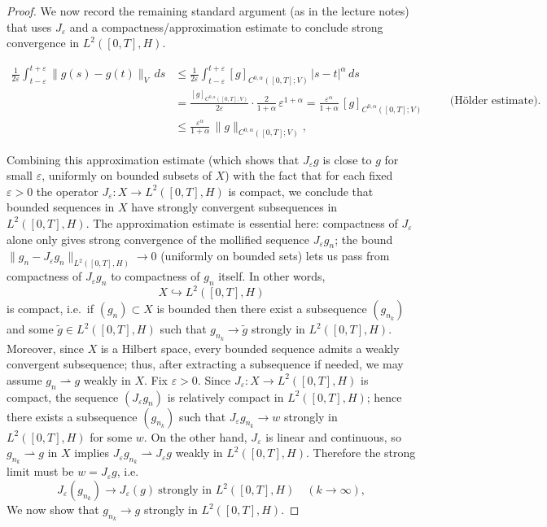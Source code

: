 \documentclass[11pt]{article}
\theoremstyle{definition}
\theoremstyle{remark}
\begin{document}
\begin{proof}
\medskip
\noindent
We now record the remaining standard argument (as in the lecture notes) that uses \(J_\varepsilon\) and a compactness/approximation estimate to conclude strong convergence in \(L^{2}([0,T],H)\).

\[
\begin{aligned}
\frac{1}{2\varepsilon}\int_{t-\varepsilon}^{t+\varepsilon}\|g(s)-g(t)\|_{V}\,ds
&\le \frac{1}{2\varepsilon}\int_{t-\varepsilon}^{t+\varepsilon}[g]_{C^{0,\alpha}([0,T];V)}\,|s-t|^{\alpha}\,ds\\
&= \frac{[g]_{C^{0,\alpha}([0,T];V)}}{2\varepsilon}\cdot \frac{2}{1+\alpha}\,\varepsilon^{1+\alpha}
= \frac{\varepsilon^{\alpha}}{1+\alpha}\,[g]_{C^{0,\alpha}([0,T];V)}\\
&\le \frac{\varepsilon^{\alpha}}{1+\alpha}\,\|g\|_{C^{0,\alpha}([0,T];V)},
\end{aligned}
\qquad \text{(H\"older estimate).}
\]

Combining this approximation estimate (which shows that \(J_\varepsilon g\) is close to \(g\) for small \(\varepsilon\), uniformly on bounded subsets of \(X\)) with the fact that for each fixed \(\varepsilon>0\) the operator \(J_\varepsilon:X\to L^{2}([0,T],H)\) is compact, we conclude that bounded sequences in \(X\) have strongly convergent subsequences in \(L^{2}([0,T],H)\). The approximation estimate is essential here: compactness of \(J_\varepsilon\) alone only gives strong convergence of the mollified sequence \(J_\varepsilon g_n\); the bound \(\|g_n-J_\varepsilon g_n\|_{L^{2}([0,T],H)}\to 0\) (uniformly on bounded sets) lets us pass from compactness of \(J_\varepsilon g_n\) to compactness of \(g_n\) itself. In other words,
\[
X\hookrightarrow L^{2}([0,T],H)
\]
is compact, i.e.\ if \((g_n)\subset X\) is bounded then there exist a subsequence \((g_{n_k})\) and some \(\tilde g\in L^{2}([0,T],H)\) such that \(g_{n_k}\to \tilde g\) strongly in \(L^{2}([0,T],H)\).
Moreover, since \(X\) is a Hilbert space, every bounded sequence admits a weakly convergent subsequence; thus, after extracting a subsequence if needed, we may assume \(g_{n}\rightharpoonup g\) weakly in \(X\).
Fix \(\varepsilon>0\). Since \(J_\varepsilon:X\to L^{2}([0,T],H)\) is compact, the sequence \((J_\varepsilon g_n)\) is relatively compact in \(L^{2}([0,T],H)\); hence there exists a subsequence \((g_{n_k})\) such that \(J_\varepsilon g_{n_k}\to w\) strongly in \(L^{2}([0,T],H)\) for some \(w\).
On the other hand, \(J_\varepsilon\) is linear and continuous, so \(g_{n_k}\rightharpoonup g\) in \(X\) implies \(J_\varepsilon g_{n_k}\rightharpoonup J_\varepsilon g\) weakly in \(L^{2}([0,T],H)\). Therefore the strong limit must be \(w=J_\varepsilon g\), i.e.
\[
J_{\varepsilon}(g_{n_k})\to J_{\varepsilon}(g)\ \text{strongly in }L^{2}([0,T],H)\quad (k\to\infty),
\]
We now show that \(g_{n_k}\to g\) strongly in \(L^{2}([0,T],H)\).


\end{proof}
\end{document}
